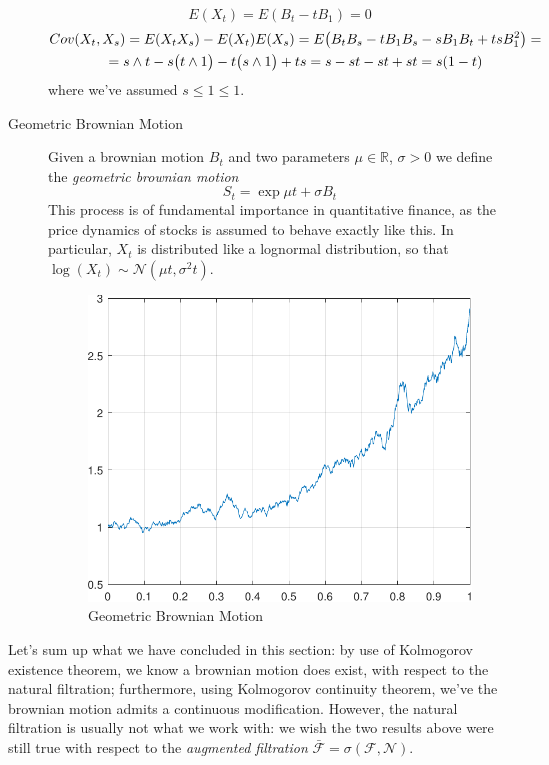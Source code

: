 \begin{description}
    \begin{equation}
        E(X_t) = E(B_t - t B_1) = 0
    \end{equation}
    \begin{gather}
        Cov(X_t, X_s) = E(X_t X_s) - E(X_t) E(X_s) = E\big(B_t B_s - t B_1 B_s - s B_1 B_t + ts B_1^2\big) = \notag \\
        = s \wedge t - s \big(t \wedge 1\big) - t \big( s \wedge 1 \big) + ts = s -st -st + st = s(1-t)
    \end{gather}
    where we've assumed $s \leq 1 \leq 1$. 
    \item[Geometric Brownian Motion] Given a brownian motion $B_t$ and two parameters $\mu \in \mathbb{R}$, $\sigma > 0$ we define the \textit{geometric brownian motion}
    \begin{equation}
        S_t = \exp{\mu t + \sigma B_t}
    \end{equation}
    This process is of fundamental importance in quantitative finance, as the price dynamics of stocks is assumed to behave exactly like this. In particular, $X_t$ is distributed like a lognormal distribution, so that $\log(X_t) \sim \mathcal{N}(\mu t, \sigma^2 t)$. 

    \begin{figure}
        \centering
        \includegraphics[width=0.5\linewidth]{assets/gbm.pdf}
        \caption{Geometric Brownian Motion}
        \label{fig:gbm}
    \end{figure}
\end{description}

Let's sum up what we have concluded in this section: by use of Kolmogorov existence theorem, we know a brownian motion does exist, with respect to the natural filtration; furthermore, using Kolmogorov continuity theorem, we've the brownian motion admits a continuous modification. However, the natural filtration is usually not what we work with: we wish the two results above were still true with respect to the \textit{augmented filtration} $\bar{\mathcal{F}} = \sigma(\mathcal{F},\mathcal{N})$. 


